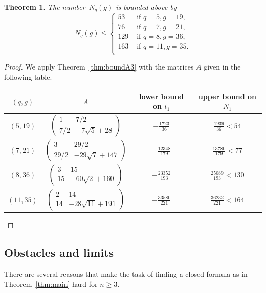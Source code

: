 \documentclass{amsart}
\newtheorem{theorem}[defin]{Theorem}
\begin{document}
\begin{theorem}\label{thm:rec3}
The number~$N_q(g)$ is bounded above by 
\[
N_q(g) \leq \begin{cases}
53 & \text{ if } q = 5 , g= 19, \\ 
76 & \text{ if } q = 7, g= 21, \\
129 & \text{ if } q = 8, g= 36, \\
163 & \text{ if } q = 11, g= 35. \\
\end{cases}
\]
\end{theorem}
\begin{proof} We apply Theorem~\ref{thm:boundA3} with the matrices $A$ given in the following table.

\begin{tabular}{ c  c  c  c   }
$(q,g)$  &  $A$ & lower bound on $t_1$ & upper bound on $N_1$  \\ \hline 
\rule{0pt}{4mm}%
$(5,19)$ & $\begin{pmatrix}
1 & 7/2 \\ 7/2 & -7\sqrt{5}+28
\end{pmatrix}$ &  $-\frac{1723}{36}$ &  $\frac{1939}{36} < 54$ \\
$(7,21)$ & $\begin{pmatrix}
3 & 29/2 \\ 29/2 & -29\sqrt{7}+147
\end{pmatrix}$ &  $-\frac{12348}{179}$ &  $\frac{13780}{179} < 77$ \\
$(8,36)$ & $\begin{pmatrix}
3 & 15 \\ 15 & -60\sqrt{2}+160
\end{pmatrix}$ &  $-\frac{23352}{193}$ &  $\frac{25089}{193} < 130$ \\
$(11,35)$ & $\begin{pmatrix}
2 & 14 \\ 14 & -28\sqrt{11}+191
\end{pmatrix}$ &  $-\frac{33580}{221}$ &  $\frac{36232}{221} < 164$ \\
\hline
\end{tabular}

\end{proof}

\subsection{Obstacles and limits}
There are several reasons that make the task of finding a closed formula as in Theorem~\ref{thm:main} hard for $n\geq 3$. 
\end{document}
